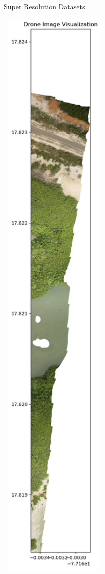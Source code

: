 \begin{frame}{Super Resolution Datasets}
    \centering
    \begin{minipage}[b]{0.49\textwidth}
        \centering
        \includegraphics[width=0.4\textwidth, height=0.95\textheight]{images/Drone_tiff.png} \\

\end{minipage}
\end{frame}
